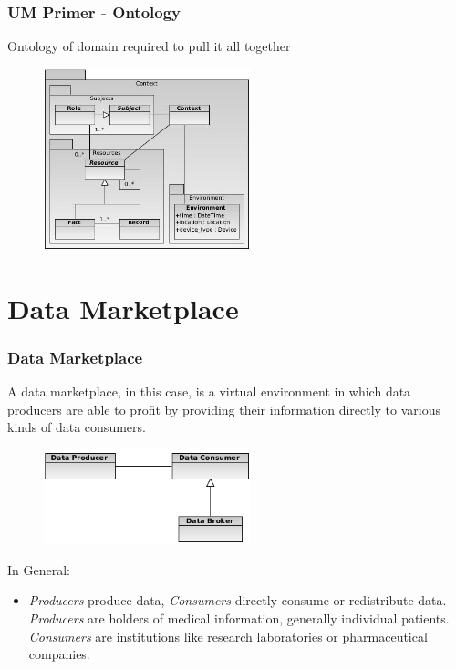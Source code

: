 \documentclass[t, 10pt]{beamer}
\begin{document}
\begin{frame}
\frametitle{UM Primer - Ontology}

Ontology of domain required to pull it all together
\begin{figure}
\includegraphics[width = 6cm]{UMOntology}
\end{figure}

\end{frame}

\section{Data Marketplace}
\begin{frame}
\frametitle{Data Marketplace}
A data marketplace, in this case, is a virtual environment in which data producers are able to profit by providing their information directly to various kinds of data consumers.  

\begin{figure}
\includegraphics[width = 6cm]{roles}
\end{figure}
\pause

In General:
\begin{itemize}
\item \textit{Producers} produce data, \textit{Consumers} directly consume or redistribute data.  \textit{Producers} are holders of medical information, generally individual patients. \textit{Consumers} are institutions like research laboratories or pharmaceutical companies.
\end{itemize}

\end{frame}
\end{document}
